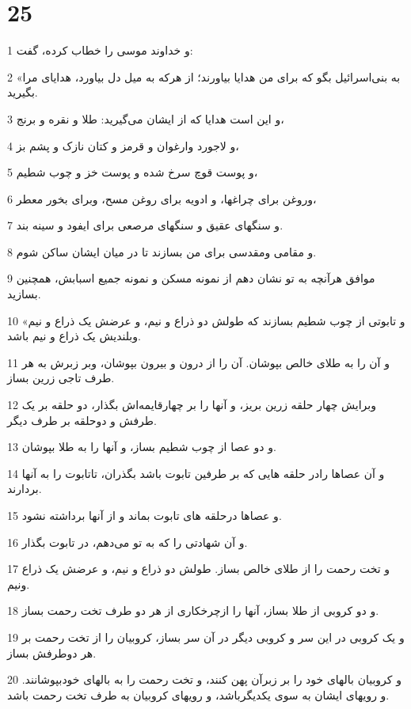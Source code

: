 \chapter{25}

\par 1 و خداوند موسی را خطاب کرده، گفت:
\par 2 «به بنی‌اسرائیل بگو که برای من هدایا بیاورند؛ از هر‌که به میل دل بیاورد، هدایای مرا بگیرید.
\par 3 و این است هدایا که از ایشان می‌گیرید: طلا و نقره و برنج،
\par 4 و لاجورد وارغوان و قرمز و کتان نازک و پشم بز،
\par 5 و پوست قوچ سرخ شده و پوست خز و چوب شطیم،
\par 6 وروغن برای چراغها، و ادویه برای روغن مسح، وبرای بخور معطر،
\par 7 و سنگهای عقیق و سنگهای مرصعی برای ایفود و سینه بند.
\par 8 و مقامی ومقدسی برای من بسازند تا در میان ایشان ساکن شوم.
\par 9 موافق هر‌آنچه به تو نشان دهم از نمونه مسکن و نمونه جمیع اسبابش، همچنین بسازید.
\par 10 «و تابوتی از چوب شطیم بسازند که طولش دو ذراع و نیم، و عرضش یک ذراع و نیم وبلندیش یک ذراع و نیم باشد.
\par 11 و آن را به طلای خالص بپوشان. آن را از درون و بیرون بپوشان، وبر زبرش به هر طرف تاجی زرین بساز.
\par 12 وبرایش چهار حلقه زرین بریز، و آنها را بر چهارقایمه‌اش بگذار، دو حلقه بر یک طرفش و دوحلقه بر طرف دیگر.
\par 13 و دو عصا از چوب شطیم بساز، و آنها را به طلا بپوشان.
\par 14 و آن عصاها رادر حلقه هایی که بر طرفین تابوت باشد بگذران، تاتابوت را به آنها بردارند.
\par 15 و عصاها درحلقه های تابوت بماند و از آنها برداشته نشود.
\par 16 و آن شهادتی را که به تو می‌دهم، در تابوت بگذار.
\par 17 و تخت رحمت را از طلای خالص بساز. طولش دو ذراع و نیم، و عرضش یک ذراع ونیم.
\par 18 و دو کروبی از طلا بساز، آنها را ازچرخکاری از هر دو طرف تخت رحمت بساز.
\par 19 و یک کروبی در این سر و کروبی دیگر در آن سر بساز، کروبیان را از تخت رحمت بر هر دوطرفش بساز.
\par 20 و کروبیان بالهای خود را بر زبرآن پهن کنند، و تخت رحمت را به بالهای خودبپوشانند. و رویهای ایشان به سوی یکدیگرباشد، و رویهای کروبیان به طرف تخت رحمت باشد.
